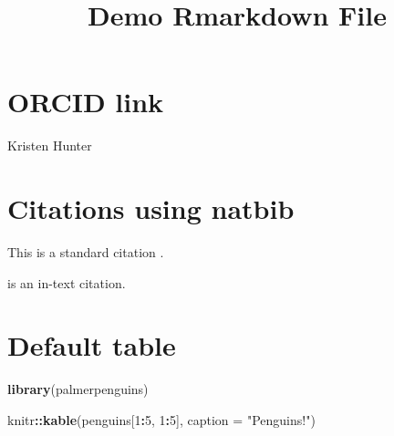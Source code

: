 \documentclass[
]{article}
\title{Demo Rmarkdown File}
\author{}
\date{\vspace{-2.5em}}
\newenvironment{Shaded}{\begin{snugshade}}{\end{snugshade}}
\newcommand{\AttributeTok}[1]{\textcolor[rgb]{0.13,0.29,0.53}{#1}}
\newcommand{\ConstantTok}[1]{\textcolor[rgb]{0.56,0.35,0.01}{#1}}
\newcommand{\DecValTok}[1]{\textcolor[rgb]{0.00,0.00,0.81}{#1}}
\newcommand{\FunctionTok}[1]{\textcolor[rgb]{0.13,0.29,0.53}{\textbf{#1}}}
\newcommand{\NormalTok}[1]{#1}
\newcommand{\SpecialCharTok}[1]{\textcolor[rgb]{0.81,0.36,0.00}{\textbf{#1}}}
\newcommand{\StringTok}[1]{\textcolor[rgb]{0.31,0.60,0.02}{#1}}
\begin{document}
\maketitle

\begin{Shaded}
\end{Shaded}

\section{ORCID link}\label{orcid-link}

Kristen Hunter

\section{Citations using natbib}\label{citations-using-natbib}

This is a standard citation \citep{Raudenbush2002}.

\citet{Spybrook2014} is an in-text citation.

\section{Default table}\label{default-table}

\begin{Shaded}
\begin{Highlighting}[]
\FunctionTok{library}\NormalTok{(palmerpenguins)}

\NormalTok{knitr}\SpecialCharTok{::}\FunctionTok{kable}\NormalTok{(penguins[}\DecValTok{1}\SpecialCharTok{:}\DecValTok{5}\NormalTok{, }\DecValTok{1}\SpecialCharTok{:}\DecValTok{5}\NormalTok{], }\AttributeTok{caption =} \StringTok{"Penguins!"}\NormalTok{)}
\end{Highlighting}
\end{Shaded}
\end{document}

